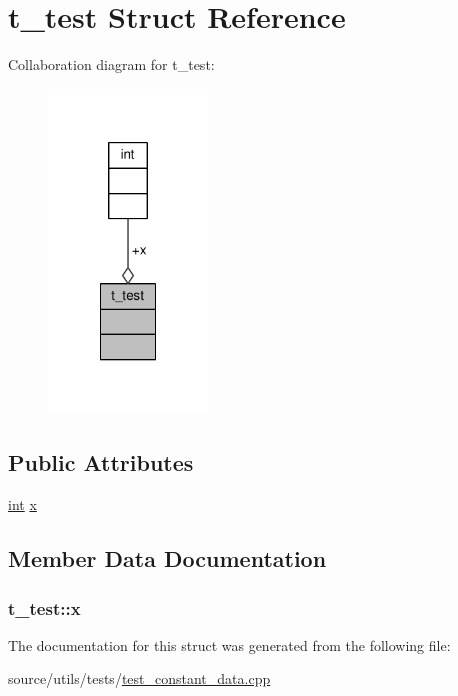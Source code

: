 \hypertarget{structt__test}{\section{t\-\_\-test Struct Reference}
\label{structt__test}
}


Collaboration diagram for t\-\_\-test\-:\nopagebreak
\begin{figure}[H]
\begin{center}
\leavevmode
\includegraphics[width=120pt]{structt__test__coll__graph}
\end{center}
\end{figure}
\subsection*{Public Attributes}
\begin{DoxyCompactItemize}
\item 
\hyperlink{classint}{int} \hyperlink{structt__test_a660c4ef17eba9dbcfedd942d31f3a96b}{x}
\end{DoxyCompactItemize}


\subsection{Member Data Documentation}
\hypertarget{structt__test_a660c4ef17eba9dbcfedd942d31f3a96b}{
\subsubsection[{x}]{ t\-\_\-test\-::x}}\label{structt__test_a660c4ef17eba9dbcfedd942d31f3a96b}


The documentation for this struct was generated from the following file\-:\begin{DoxyCompactItemize}
\item 
source/utils/tests/\hyperlink{test__constant__data_8cpp}{test\-\_\-constant\-\_\-data.\-cpp}\end{DoxyCompactItemize}
